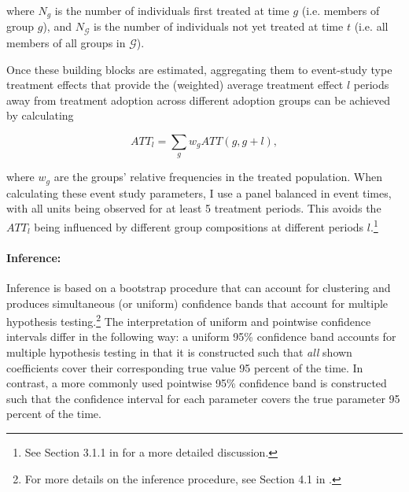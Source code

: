 \noindent where $N_g$ is the number of individuals first treated at time $g$
(i.e. members of group $g$), and $N_\mathcal{G}$ is the number of individuals
not yet treated at time $t$ (i.e. all members of all groups in $\mathcal{G}$).

Once these building blocks are estimated, aggregating them to event-study type treatment effects that provide the (weighted)
average treatment effect $l$ periods away from treatment adoption across
different adoption groups can be achieved by calculating

\begin{equation}
    \label{eq:att_es}
    ATT_l = \sum_g w_gATT(g,g+l),
\end{equation}

\noindent where $w_g$ are the groups' relative frequencies in the treated
population. When calculating these event study parameters, I use a panel
balanced in event times, with all units being observed for at least 5 treatment
periods. This avoids the $ATT_l$ being influenced by different group
compositions at different periods $l$.\footnote{See Section 3.1.1 in
\citet{callaway2021difference} for a more detailed discussion.}


\paragraph{Inference:}%
\label{par:inference_}

Inference is based on a bootstrap procedure that can account for clustering and
produces simultaneous (or uniform) confidence bands that account for multiple
hypothesis testing.\footnote{For more details on the inference procedure, see
Section 4.1 in \citet{callaway2021difference}.} The interpretation of uniform
and pointwise confidence intervals differ in the following way: a uniform 95\%
confidence band accounts for multiple hypothesis testing in that it is
constructed such that \textit{all} shown coefficients cover their corresponding
true value 95 percent of the time. In contrast, a more commonly used pointwise
95\% confidence band is constructed such that the confidence interval for each
parameter covers the true parameter 95 percent of the time.

